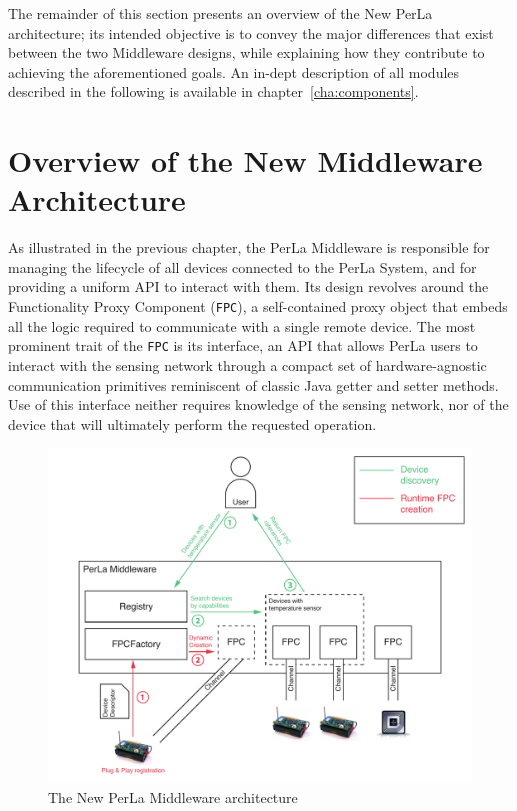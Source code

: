 The remainder of this section presents an overview of the New PerLa
architecture; its intended objective is to convey the major differences that
exist between the two Middleware designs, while explaining how they contribute
to achieving the aforementioned goals. An in-dept description of all modules
described in the following is available in chapter~\ref{cha:components}.

\section{Overview of the New Middleware Architecture}

As illustrated in the previous chapter, the PerLa Middleware is responsible for
managing the lifecycle of all devices connected to the PerLa System, and for
providing a uniform API to interact with them. Its design revolves around the
Functionality Proxy Component (\texttt{FPC}), a self-contained proxy object
that embeds all the logic required to communicate with a single remote device.
The most prominent trait of the \texttt{FPC} is its interface, an API that
allows PerLa users to interact with the sensing network through a compact set
of hardware-agnostic communication primitives reminiscent of classic Java
getter and setter methods. Use of this interface neither requires knowledge of
the sensing network, nor of the device that will ultimately perform the
requested operation.

\begin{figure}[h!]
\includegraphics[width=\textwidth]{imgs/middleware_overview.pdf}
\caption{The New PerLa Middleware architecture}
\end{figure}

